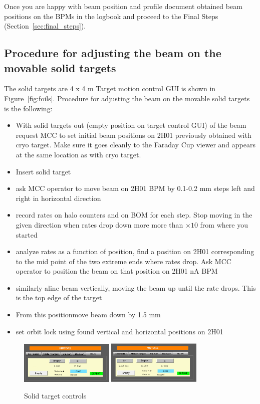 Once you are happy with beam position and profile document obtained beam positions on the BPMs in the logbook and proceed to the Final Steps (Section~\ref{sec:final_steps}).

\subsection{Procedure for adjusting the beam on the movable solid targets} 

The solid targets are 4 x 4 m
Target motion control GUI is shown in Figure~\ref{fig:foils}.
Procedure for adjusting the beam on the movable solid targets is the following:

\begin{itemize}
\item With solid targets out (empty position on target control GUI) of the beam request MCC to set initial beam positions on 2H01 previously obtained with cryo target. Make sure it goes cleanly to the Faraday Cup viewer and appears at the same location as with cryo target.
\item Insert solid target
\item ask MCC operator to move beam on 2H01 BPM by 0.1-0.2 mm steps left and right in horizontal direction
\item record rates on halo counters and on BOM for each step. Stop moving in the given direction when rates drop down more more than $\times 10$ from where you started 
\item analyze rates as a function of position, find a position on 2H01 corresponding to the mid point of the two extreme ends where rates drop. Ask MCC operator to position the beam on that position on 2H01 nA BPM
\item  similarly aline beam vertically, moving the beam up until the rate drops. This is the top edge of the target
\item From this positionmove beam down by 1.5 mm
\item set orbit lock using found vertical and horizontal positions on 2H01 
\end{itemize}

\begin{figure}[htb!]
\centering
\includegraphics[width=0.4\textwidth]{1foil.PNG}
\includegraphics[width=0.4\textwidth]{2foil.PNG}
\caption{Solid target controls}
\label{fig:fils}
\end{figure}

